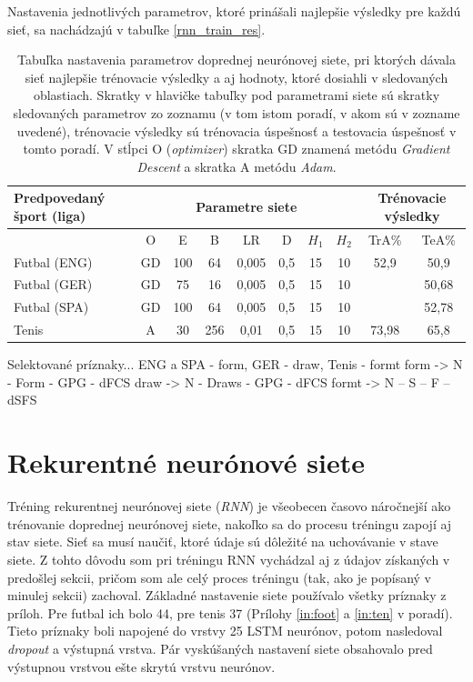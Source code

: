 Nastavenia jednotlivých parametrov, ktoré prinášali najlepšie výsledky pre každú sieť, sa nachádzajú v tabuľke \ref{rnn_train_res}.

\begin{table}[h!]
\begin{center}
\begin{tabular}{ p{7em}|c|c|c|c|c|c|c|c|c| } 
 Predpovedaný šport (liga) & \multicolumn{7}{|c|}{Parametre siete} & \multicolumn{2}{|p{5em}|}{Trénovacie výsledky}  \\ 
 \hline
  & O & E & B & LR & D & $H_1$ & $H_2$ & TrA\% & TeA\% \\
 \hline \hline
 Futbal (ENG) & GD & 100 & 64 & 0,005 & 0,5 & 15 & 10 & 52,9 & 50,9  \\ 
 Futbal (GER) & GD & 75 & 16 & 0,005 & 0,5 & 15 & 10 &  & 50,68  \\ 
 Futbal (SPA) & GD & 100 & 64 & 0,005 & 0,5 & 15 & 10 &  & 52,78  \\ 
 Tenis & A & 30 & 256 & 0,01 & 0,5 & 15 & 10 & 73,98 & 65,8  \\ 
 \hline
\end{tabular}
\caption{Tabuľka nastavenia parametrov doprednej neurónovej siete, pri ktorých dávala sieť najlepšie trénovacie výsledky a aj hodnoty, ktoré dosiahli v sledovaných oblastiach. Skratky v hlavičke tabuľky pod parametrami siete sú skratky sledovaných parametrov zo zoznamu (v tom istom poradí, v akom sú v zozname uvedené), trénovacie výsledky sú trénovacia úspešnosť a testovacia úspešnosť v tomto poradí. V stĺpci O (\textit{optimizer}) skratka GD znamená metódu \textit{Gradient Descent} a skratka A metódu \textit{Adam}.}
\label{ff_train_res}
\end{center}
\end{table}

Selektované príznaky...
ENG a SPA - form, GER - draw, Tenis - formt
form -> N - Form - GPG - dFCS
draw -> N - Draws - GPG - dFCS
formt -> N – S – F – dSFS


\section{Rekurentné neurónové siete}
Tréning rekurentnej neurónovej siete (\textit{RNN}) je všeobecen časovo náročnejší ako trénovanie doprednej neurónovej siete, nakoľko sa do procesu tréningu zapojí aj stav siete. Sieť sa musí naučiť, ktoré údaje sú dôležité na uchovávanie v stave siete.
Z tohto dôvodu som pri tréningu RNN vychádzal aj z údajov získaných v predošlej sekcii, pričom som ale celý proces tréningu (tak, ako je popísaný v minulej sekcii) zachoval.
Základné nastavenie siete používalo všetky príznaky z príloh. 
Pre futbal ich bolo 44, pre tenis 37 (Prílohy \ref{in:foot} a \ref{in:ten} v poradí).
Tieto príznaky boli napojené do vrstvy 25 LSTM neurónov, potom nasledoval \textit{dropout} a výstupná vrstva.
Pár vyskúšaných nastavení siete obsahovalo pred výstupnou vrstvou ešte skrytú vrstvu neurónov.

